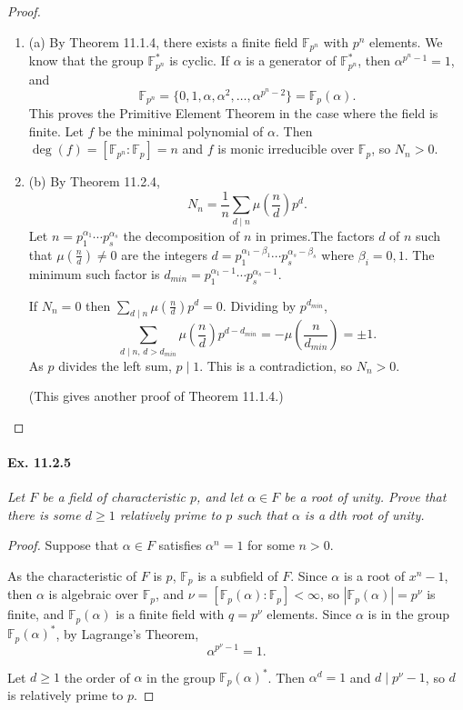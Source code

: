 \documentclass[11pt,a4paper]{article}
\newcommand{\be} {\begin{enumerate}}
\newcommand{\ee} {\end{enumerate}}
\newcommand{\F}{\mathbb{F}}
\begin{document}
\begin{proof}

\be

\item[(a)] By Theorem 11.1.4, there exists a finite field $\F_{p^n}$ with $p^n$ elements. We know that the group $\F_{p^n}^*$ is cyclic. If $\alpha$ is a generator of $\F_{p^n}^*$, then $\alpha^{p^n-1} = 1$, and
$$\F_{p^n} =\{0,1,\alpha,\alpha^2,\ldots,\alpha^{p^{n}-2}\}= \F_p(\alpha).$$ This proves the Primitive Element Theorem in the case where the field is finite. Let $f$ be the minimal polynomial of $\alpha$. Then $\deg(f) = [\F_{p^n}:\F_p] = n$ and $f$ is monic irreducible over $\F_p$, so $N_n>0$.

\item[(b)] By Theorem 11.2.4,
 $$N_n = \frac{1}{n} \sum_{d\mid n} \mu\left(\frac{n}{d}\right) p^{d}.$$
 Let $n = p_1^{\alpha_1}\cdots p_s^{\alpha_s}$ the decomposition of $n$ in primes.The factors $d$ of $n$ such that $\mu\left(\frac{n}{d}\right) \ne 0$ are the integers $d = p_1^{\alpha_1-\beta_1} \cdots p_s^{\alpha_s-\beta_s}$ where $\beta_i = 0,1$. The minimum such factor is $d_{min} = p_1^{\alpha_1-1} \cdots p_s^{\alpha_s-1}$.
 
 If $N_n=0$ then $\sum_{d\mid n} \mu(\frac{n}{d}) p^{d} = 0$. Dividing by $p^{d_{min}}$,
 $$\sum_{d\mid n,\, d > d_{min}} \mu\left(\frac{n}{d}\right) p^{d-d_{min}}=-\mu\left(\frac{n}{d_{min}}\right)  =  \pm 1.$$
 As $p$ divides the left sum, $p\mid 1$. This is a contradiction, so $N_n >0$.
 
 (This gives another proof of Theorem 11.1.4.)
 \ee
 \end{proof}

\paragraph{Ex. 11.2.5}

{\it Let $F$ be a field of characteristic $p$, and let $\alpha \in F$ be a root of unity. Prove that there is some $d\geq 1$ relatively prime to $p$ such that $\alpha$ is a $d$th root of unity.
}

\begin{proof}
Suppose that $\alpha \in F$ satisfies $\alpha^n = 1$ for some $n>0$.

As the characteristic of $F$ is $p$, $\F_p$ is a subfield of $F$. Since $\alpha$ is a root of $x^n-1$, then $\alpha$ is algebraic over $\F_p$, and $\nu = [\F_p(\alpha) : \F_p]<\infty$, so $|\F_p(\alpha)| = p^{\nu}$ is finite, and $\F_p(\alpha)$ is a finite field with $q = p^\nu$ elements. Since $\alpha$ is in the group $\F_p(\alpha)^*$, by Lagrange's Theorem, $$\alpha^{p^\nu -1} = 1.$$

Let $d\geq 1$ the order of $\alpha$ in the group $\F_p(\alpha)^*$. Then $\alpha^d = 1$ and $d \mid p^\nu - 1$, so $d$ is relatively prime to $p$.
\end{proof}
\end{document}
